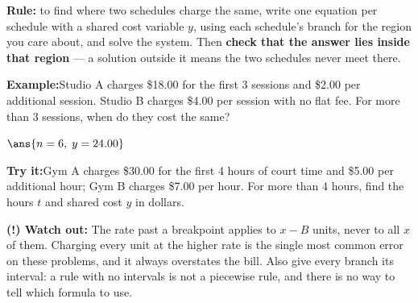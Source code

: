 \documentclass[12pt]{article}
\begin{document}

\begin{formulabox}
\textbf{Rule:} to find where two schedules charge the same, write one equation
per schedule with a shared cost variable $y$, using each schedule's branch for
the region you care about, and solve the system. Then \textbf{check that the
answer lies inside that region} --- a solution outside it means the two
schedules never meet there.
\end{formulabox}

\begin{examplebox}
\textbf{Example:}\quad Studio A charges \$18.00 for the first 3 sessions and
\$2.00 per additional session. Studio B charges \$4.00 per session with no flat
fee. For more than 3 sessions, when do they cost the same?

$\ans{n = 6, \; y = 24.00}$
\end{examplebox}

\begin{tryitbox}
\textbf{Try it:}\quad Gym A charges \$30.00 for the first 4 hours of court time
and \$5.00 per additional hour; Gym B charges \$7.00 per hour. For more than
4 hours, find the hours $t$ and shared cost $y$ in dollars.\\[2pt]
\end{tryitbox}

\begin{watchoutbox}
\textbf{(!) Watch out:} The rate past a breakpoint applies to
$x - B$ units, never to all $x$ of them. Charging every unit at the higher rate
is the single most common error on these problems, and it always overstates the
bill. Also give every branch its interval: a rule with no intervals is not a
piecewise rule, and there is no way to tell which formula to use.
\end{watchoutbox}
\end{document}

